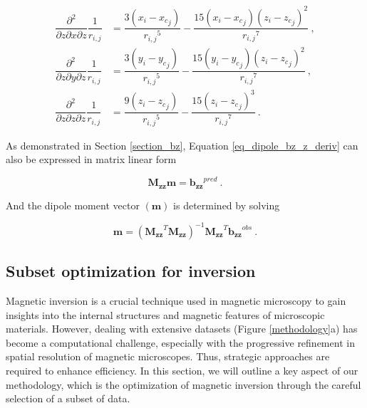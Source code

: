\begin{equation}
\begin{aligned}
\dfrac{\partial^2}{\partial z \partial x \partial z} \dfrac{1}{r_{i,j}} &=
\dfrac{3(x_i - {x_c}_j)}{{r_{i,j}}^5} - \dfrac{15(x_i - {x_c}_j)(z_i - {z_c}_j)^2}{{r_{i,j}}^7}\ ,
\\
\dfrac{\partial^2}{\partial z \partial y \partial z} \dfrac{1}{r_{i,j}} &=
\dfrac{3(y_i - {y_c}_j)}{{r_{i,j}}^5} - \dfrac{15(y_i - {y_c}_j)(z_i - {z_c}_j)^2}{{r_{i,j}}^7}\ ,
\\
\dfrac{\partial^2}{\partial z \partial z \partial z} \dfrac{1}{r_{i,j}} &=
\dfrac{9(z_i - {z_c}_j)}{{r_{i,j}}^5} - \dfrac{15(z_i - {z_c}_j)^3}{{r_{i,j}}^7}\ .
\end{aligned}
\end{equation}   \bigskip

As demonstrated in Section \ref{section_bz}, Equation \ref{eq_dipole_bz_z_deriv} can also be expressed in matrix linear form

\begin{equation}
\label{qdhqM4s9Ln1}
\mathbf{{M_{zz}}} \mathbf{m} = \mathbf{{b_{zz}}}^{pred} \ .
\end{equation}

And the dipole moment vector $(\mathbf{m})$ is determined by solving

\begin{equation}
 \mathbf{m} = {\left ( \mathbf{{M_{zz}}}^T \mathbf{{M_{zz}}} \right )}^{-1} \mathbf{{M_{zz}}}^T\mathbf{{b_{zz}}}^{obs}\ .
\end{equation}


\subsection{Subset optimization for inversion}

Magnetic inversion is a crucial technique used in magnetic microscopy to gain insights into the internal structures and magnetic features of microscopic materials. However, dealing with extensive datasets (Figure \ref{methodology}a) has become a computational challenge, especially with the progressive refinement in spatial resolution of magnetic microscopes. Thus, strategic approaches are required to enhance efficiency. In this section, we will outline a key aspect of our methodology, which is the optimization of magnetic inversion through the careful selection of a subset of data.

